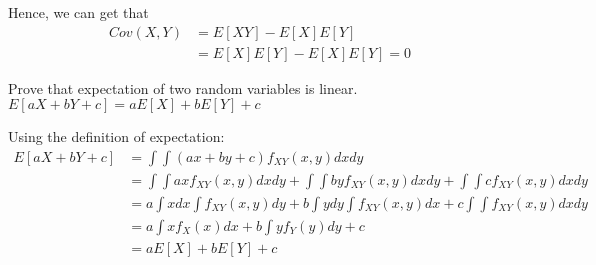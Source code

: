 \documentclass[addpoints,12pt]{exam}
\begin{document}
\begin{questions}
\begin{solution}
	Hence, we can get that 
	\begin{align*}
		Cov(X, Y) &= E[XY] - E[X]E[Y]
		\\
		&= E[X]E[Y] - E[X]E[Y] = 0
	\end{align*}
	\end{solution}
	\question Prove that expectation of two random variables is linear. $E[aX + bY + c] = a E[X] + bE[Y] + c$
	\begin{solution}
		Using the definition of expectation:
		\begin{align*}
		E[aX + bY + c] &= \int \int (ax + by + c) f_{XY}(x, y) dx dy
		\\
		&= \int \int ax f_{XY}(x, y) dx dy + \int \int by f_{XY}(x, y) dx dy + \int \int c f_{XY}(x, y) dx dy
		\\
		&= a \int x dx \int f_{XY}(x, y) dy + b \int y dy \int f_{XY}(x, y) dx + c \int \int f_{XY}(x, y) dx dy
		\\
		&= a \int x f_{X}(x) dx + b \int y f_{Y}(y) dy + c
		\\
		&= a E[X] + b E[Y] + c
		\end{align*}
	\end{solution}
\end{questions}
\end{document}
